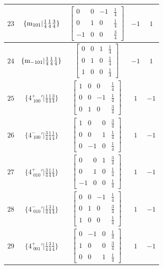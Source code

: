 \documentclass[fleqn,8pt]{jsarticle}
\begin{document}
\begin{longtable}{ccccc}
$ 23 $ & $ \{{\rm m}_{101}|\frac{1}{4} \frac{1}{4} \frac{3}{4}\} $ & $ \begin{bmatrix} 0 & 0 & -1 & \frac{1}{4} \\ 0 & 1 & 0 & \frac{1}{4} \\ -1 & 0 & 0 & \frac{3}{4} \end{bmatrix} $ & $ -1 $ & $ 1 $ \\ \hline
$ 24 $ & $ \{{\rm m}_{-101}|\frac{1}{4} \frac{1}{4} \frac{1}{4}\} $ & $ \begin{bmatrix} 0 & 0 & 1 & \frac{1}{4} \\ 0 & 1 & 0 & \frac{1}{4} \\ 1 & 0 & 0 & \frac{1}{4} \end{bmatrix} $ & $ -1 $ & $ 1 $ \\ \hline
$ 25 $ & $ \{4^{+}_{\,\,100}{}'|\frac{1}{4} \frac{1}{4} \frac{3}{4}\} $ & $ \begin{bmatrix} 1 & 0 & 0 & \frac{1}{4} \\ 0 & 0 & -1 & \frac{1}{4} \\ 0 & 1 & 0 & \frac{3}{4} \end{bmatrix} $ & $ 1 $ & $ -1 $ \\ \hline
$ 26 $ & $ \{4^{-}_{\,\,100}{}'|\frac{3}{4} \frac{1}{4} \frac{1}{4}\} $ & $ \begin{bmatrix} 1 & 0 & 0 & \frac{3}{4} \\ 0 & 0 & 1 & \frac{1}{4} \\ 0 & -1 & 0 & \frac{1}{4} \end{bmatrix} $ & $ 1 $ & $ -1 $ \\ \hline
$ 27 $ & $ \{4^{+}_{\,\,010}{}'|\frac{3}{4} \frac{1}{4} \frac{1}{4}\} $ & $ \begin{bmatrix} 0 & 0 & 1 & \frac{3}{4} \\ 0 & 1 & 0 & \frac{1}{4} \\ -1 & 0 & 0 & \frac{1}{4} \end{bmatrix} $ & $ 1 $ & $ -1 $ \\ \hline
$ 28 $ & $ \{4^{-}_{\,\,010}{}'|\frac{1}{4} \frac{3}{4} \frac{1}{4}\} $ & $ \begin{bmatrix} 0 & 0 & -1 & \frac{1}{4} \\ 0 & 1 & 0 & \frac{3}{4} \\ 1 & 0 & 0 & \frac{1}{4} \end{bmatrix} $ & $ 1 $ & $ -1 $ \\ \hline
$ 29 $ & $ \{4^{+}_{\,\,001}{}'|\frac{1}{4} \frac{3}{4} \frac{1}{4}\} $ & $ \begin{bmatrix} 0 & -1 & 0 & \frac{1}{4} \\ 1 & 0 & 0 & \frac{3}{4} \\ 0 & 0 & 1 & \frac{1}{4} \end{bmatrix} $ & $ 1 $ & $ -1 $ \\ \hline

\end{longtable}
\end{document}
